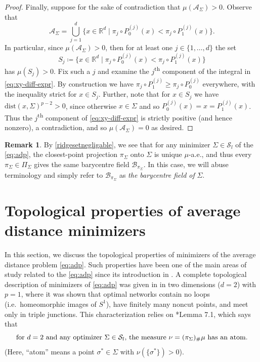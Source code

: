 \documentclass[preprint, reqno]{amsart}
\newcommand{\dist}{\mathrm{dist}}
\theoremstyle{definition}
\newtheorem{remark}[definition]{Remark}
\numberwithin{equation}{section}
\begin{document}
\begin{proof}
  Finally, suppose for the sake of contradiction that
  $\mu(\mathcal{A}_{\Sigma})> 0$. Observe that
  \[
    \mathcal{A}_{\Sigma} = \bigcup_{j=1}^d \{x \in \mathbb{R}^d \mid
    \pi_j \circ P_0^{(j)}(x) < \pi_j \circ P_1^{(j)}(x)\}.
  \]
  In particular, since $\mu(\mathcal{A}_{\Sigma}) > 0$, then for at
  least one $j \in \{1,\ldots,d\}$ the set
  \[
    S_j \coloneqq \{x \in \mathbb{R}^d \mid \pi_j \circ P_0^{(j)}(x) <
    \pi_j \circ P_1^{(j)}(x)\}
  \]
  has $\mu(S_j) > 0$. Fix such a $j$ and examine the
  $j$\textsuperscript{th} component of the integral in
  \eqref{eq:xy-diff-expr}. By construction we have $\pi_j \circ
  P_1^{(j)} \geq \pi_j \circ P_0^{(j)}$ everywhere, with the
  inequality strict for $x \in S_j$. Further, note that for $x \in
  S_j$ we have $\dist(x,\Sigma)^{p-2} > 0$, since otherwise $x \in
  \Sigma$ and so $P_0^{(j)}(x) = x = P_1^{(j)}(x)$. Thus the
  $j$\textsuperscript{th} component of \eqref{eq:xy-diff-expr} is
  strictly positive (and hence nonzero), a contradiction, and so
  $\mu(\mathcal A_\Sigma) = 0$ as desired.
\end{proof}

\begin{remark}\label{remark:afternegligibilityofridgeset}
  By \cref{ridgesetnegligable}, we see that for any minimizer $\Sigma
  \in \mathcal{S}_l$ of the \eqref{eq:adp}, the closest-point
  projection $\pi_{\Sigma}$ onto $\Sigma$ is unique $\mu$-a.e., and
  thus every $\pi_{\Sigma} \in \Pi_{\Sigma}$ gives the same barycentre
  field $\mathcal{B}_{\pi_{\Sigma}}$. In this case, we will abuse
  terminology and simply refer to $\mathcal{B}_{\pi_{\Sigma}}$ as
  \textit{the barycentre field of }$\Sigma$.
\end{remark}


\section{Topological properties of average distance
  minimizers}\label{sec:topologicalproperties}
In this section, we discuss the topological properties of minimizers
of the average distance problem \eqref{eq:adp}. Such properties have
been one of the main areas of study related to the \eqref{eq:adp}
since its introduction in \cite{Buttazzo02}. A complete topological
description of minimizers of \eqref{eq:adp} was given in
\cite{Buttazzo03} in two dimensions ($d=2$) with $p=1$, where it was
shown that optimal networks contain no loops (i.e.\ homeomorphic
images of $S^1$), have finitely many noncut points, and meet only in
triple junctions. This characterization relies on
\cite{Buttazzo03}*{Lemma 7.1}, which says that
\begin{equation}\label{eqn:atom-exists}
  \hbox{for  $d=2$ and any optimizer $\Sigma \in \mathcal{S}_l$,
    the measure $\nu = (\pi_{\Sigma})_{\#}\mu$ has an atom.}
\end{equation}
(Here, ``atom'' means a point $\sigma^* \in \Sigma$ with
$\nu(\{\sigma^*\}) >0$).
\end{document}
